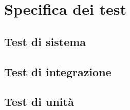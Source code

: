 \section{Specifica dei test}

\subsection{Test di sistema}
\subsection{Test di integrazione}
\subsection{Test di unità}
